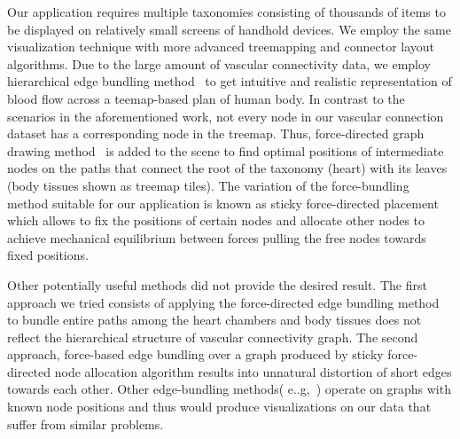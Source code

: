 Our application requires multiple taxonomies consisting of thousands of items to be displayed on relatively small screens of handhold devices. We employ the same visualization technique with more advanced treemapping and connector layout algorithms. Due to the large amount of vascular connectivity data, we employ hierarchical edge bundling method~\cite{Hol06} to get intuitive and realistic representation of blood flow across a teemap-based plan of human body.
In contrast to the scenarios in the aforementioned work, not every node in our vascular connection dataset has a corresponding node in the treemap. Thus, force-directed graph drawing method~\cite{BET+99} is added to the scene to find optimal positions of intermediate nodes on the paths that connect the root of the taxonomy (heart) with its leaves (body tissues shown as treemap tiles). The variation of the force-bundling method suitable for our application is known as sticky force-directed placement~\cite{FR91} which allows to fix the positions of certain nodes and allocate other nodes to achieve mechanical equilibrium between forces pulling the free nodes towards fixed positions.

Other potentially useful methods did not provide the desired result. The first approach we tried consists of applying the
force-directed edge bundling method~\cite{HW09} to bundle entire paths among the heart chambers and body tissues does not reflect the hierarchical structure of vascular connectivity graph. The second approach, force-based edge bundling over a graph produced by sticky force-directed node allocation algorithm results into unnatural distortion of short edges towards each other. Other edge-bundling methods( e..g,~\cite{GHN+11}\cite{HET12}\cite{SHH11}) operate on graphs with known node positions and thus would produce visualizations on our data that suffer from similar problems.



